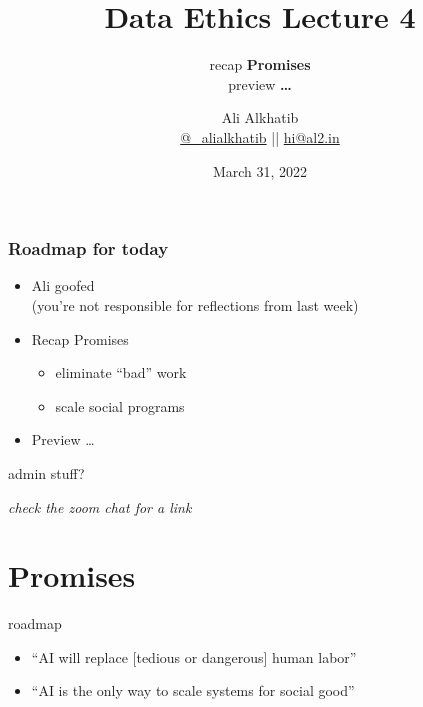 \documentclass[aspectratio=169,17pt]{beamer} %
\title{Data Ethics Lecture 4}
\subtitle{recap {\bfseries Promises}\\preview {\bfseries \dots}}
\author[Ali Alkhatib]{{Ali Alkhatib}\\
\href{http://twitter.com/_alialkhatib}{@\_alialkhatib} || \href{mailto:hi@al2.in}{hi@al2.in}}
\date{March 31, 2022}
\newcommand{\onlyinsubfile}[1]{#1}
\newcommand{\notinsubfile}[1]{}
\begin{document}
\renewcommand{\onlyinsubfile}[1]{}
\renewcommand{\notinsubfile}[1]{#1}


\begin{frame}
\titlepage
\end{frame}

\begin{frame}[t]\frametitle{Roadmap for today}

\begin{itemize}
    \item Ali goofed
    {\small\\(you're not responsible for reflections from last week)}
    \item Recap Promises
    \begin{itemize}
        \item eliminate ``bad'' work
        \item scale social programs
    \end{itemize}
    \item Preview \dots
\end{itemize}

\end{frame}

\begin{frame}{admin stuff?}
    
    \begin{itemize}
    \end{itemize}

\end{frame}


\begin{frame}[plain]

\centering
\emph{check the zoom chat for a link}

\end{frame}


\section{Promises}


\begin{frame}{roadmap}
\begin{itemize}
    \item ``AI will replace [tedious or dangerous] human labor''
    \item ``AI is the only way to scale systems for social good''
\end{itemize}

\end{frame}
\end{document}
